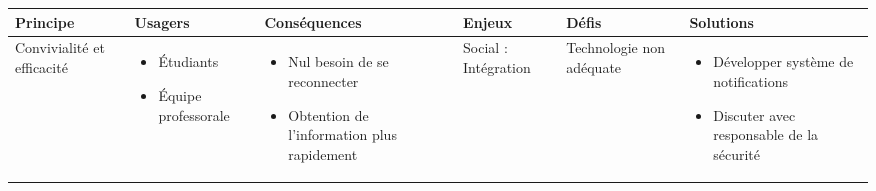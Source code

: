 \begin{tabular}{P{0.15\textwidth}P{0.15\textwidth}P{0.15\textwidth}P{0.15\textwidth}P{0.15\textwidth}P{0.15\textwidth}}
	\hline
	\bf Principe & \bf Usagers & \bf Conséquences & \bf Enjeux & \bf Défis & \bf Solutions \\
	\hline
	\hline
	Convivialité et efficacité
	& \begin{itemize}
		\item Étudiants
		\item Équipe professorale
	\end{itemize} 
	& \begin{itemize}
		\item Nul besoin de se reconnecter
		\item Obtention de l'information plus rapidement
	\end{itemize}
	& Social : Intégration
	& Technologie non adéquate
	& \begin{itemize}
		\item Développer système de notifications
		\item Discuter avec responsable de la sécurité
	\end{itemize}
	\\
	\hline
\end{tabular}